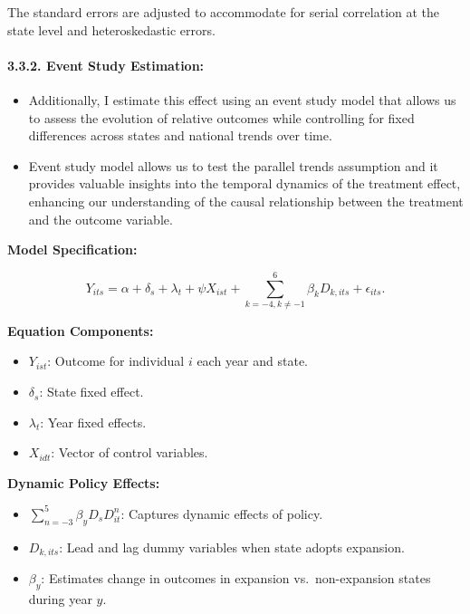 \documentclass[
]{article}
\providecommand{\tightlist}{%
  \setlength{\itemsep}{0pt}\setlength{\parskip}{0pt}}
\begin{document}
The standard errors are adjusted to accommodate for serial correlation
at the state level and heteroskedastic errors.

\hypertarget{event-study-estimation}{%
\paragraph{3.3.2. Event Study
Estimation:}\label{event-study-estimation}}

\begin{itemize}
\item
  Additionally, I estimate this effect using an event study model that
  allows us to assess the evolution of relative outcomes while
  controlling for fixed differences across states and national trends
  over time.
\item
  Event study model allows us to test the parallel trends assumption and
  it provides valuable insights into the temporal dynamics of the
  treatment effect, enhancing our understanding of the causal
  relationship between the treatment and the outcome variable.
\end{itemize}

\textbf{Model Specification:}

\begin{equation}
{Y}_{its}=  {\alpha} + {\delta}_s + {\lambda}_t+{\psi}{X}_{ist} + \sum_{k=-4,k\neq -1}^{6} {\beta}_k{D}_{k,its} 
 +{\epsilon}_{its}.
\end{equation}

\textbf{Equation Components:}

\begin{itemize}
\tightlist
\item
  \(Y_{ist}\): Outcome for individual \(i\) each year and state.
\item
  \(\delta_s\): State fixed effect.
\item
  \(\lambda_t\): Year fixed effects.
\item
  \(X_{idt}\): Vector of control variables.
\end{itemize}

\textbf{Dynamic Policy Effects:}

\begin{itemize}
\tightlist
\item
  \(\sum_{n=-3}^{5} \beta_y D_s D_{it}^n\): Captures dynamic effects of
  policy.
\item
  \(D_{k,its}\): Lead and lag dummy variables when state adopts
  expansion.
\item
  \({\beta}_y\): Estimates change in outcomes in expansion
  vs.~non-expansion states during year \(y\).
\end{itemize}
\end{document}
